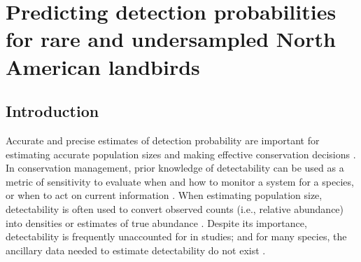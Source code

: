 \chapter{Predicting detection probabilities for rare and undersampled North American landbirds}

	

\section{Introduction}

\par Accurate and precise estimates of detection probability are important for estimating accurate population sizes and making effective conservation decisions \citep{bennett_how_2024}.
In conservation management, prior knowledge of detectability can be used as a metric of sensitivity to evaluate when and how to monitor a system for a species, or when to act on current information \citep{canessa_when_2015, bennett_when_2018}. 
When estimating population size, detectability is often used to convert observed counts (i.e., relative abundance) into densities or estimates of true abundance \citep{solymos_calibrating_2013, johnson_defense_2008}.
Despite its importance, detectability is frequently unaccounted for in studies; and for many species, the ancillary data needed to estimate detectability do not exist \citep{bennett_how_2024}.

